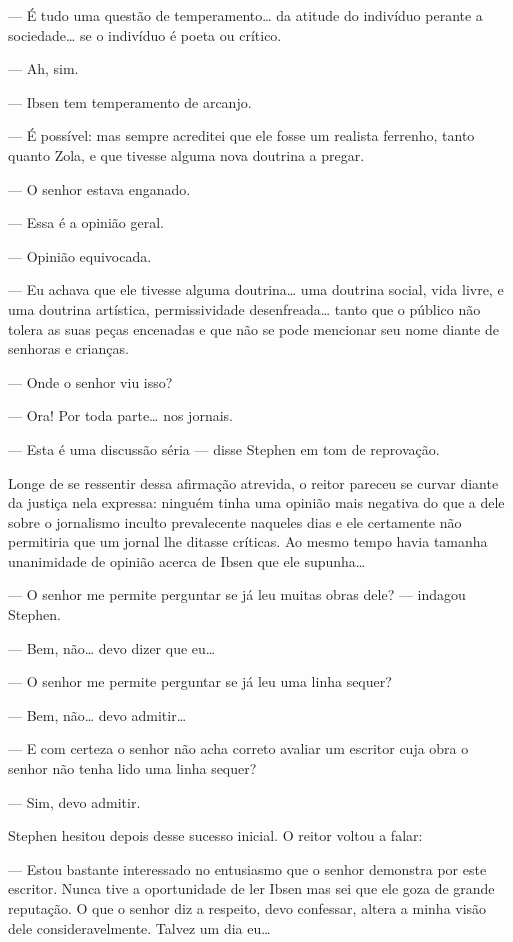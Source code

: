 --- É tudo uma questão de temperamento\ldots{} da atitude do indivíduo
perante a sociedade\ldots{} se o indivíduo é poeta ou crítico.

--- Ah, sim.

--- Ibsen tem temperamento de arcanjo.

--- É possível: mas sempre acreditei que ele fosse um realista
ferrenho, tanto quanto Zola, e que tivesse alguma nova doutrina a
pregar.

--- O senhor estava enganado.

--- Essa é a opinião geral.

--- Opinião equivocada.

--- Eu achava que ele tivesse alguma doutrina\ldots{} uma doutrina
social, vida livre, e uma doutrina artística, permissividade
desenfreada\ldots{} tanto que o público não tolera as suas peças encenadas e		
que não se pode mencionar seu nome diante de senhoras e crianças.		

--- Onde o senhor viu isso?

--- Ora!  Por toda parte\ldots{} nos jornais.

--- Esta é uma discussão séria --- disse Stephen em tom de
reprovação.

Longe de se ressentir dessa afirmação atrevida, o reitor pareceu se
curvar diante da justiça nela expressa: ninguém tinha uma opinião mais
negativa do que a dele sobre o jornalismo inculto prevalecente naqueles
dias e ele certamente não permitiria que um jornal lhe ditasse
críticas.  Ao mesmo tempo havia tamanha unanimidade de opinião acerca
de Ibsen que ele supunha\ldots{}

--- O senhor me permite perguntar se já leu muitas obras dele? ---
indagou Stephen.

--- Bem, não\ldots{} devo dizer que eu\ldots{}

--- O senhor me permite perguntar se já leu uma linha sequer?

--- Bem, não\ldots{} devo admitir\ldots{}

--- E com certeza o senhor não acha correto avaliar um escritor
cuja obra o senhor não tenha lido uma linha sequer?

--- Sim, devo admitir.

Stephen hesitou depois desse sucesso inicial.  O reitor voltou a
falar:

--- Estou bastante interessado no entusiasmo que o senhor
demonstra por este escritor.  Nunca tive a oportunidade de ler Ibsen
mas sei que ele goza de grande reputação.  O que o senhor diz a
respeito, devo confessar, altera a minha visão dele consideravelmente.
Talvez um dia eu\ldots{}

